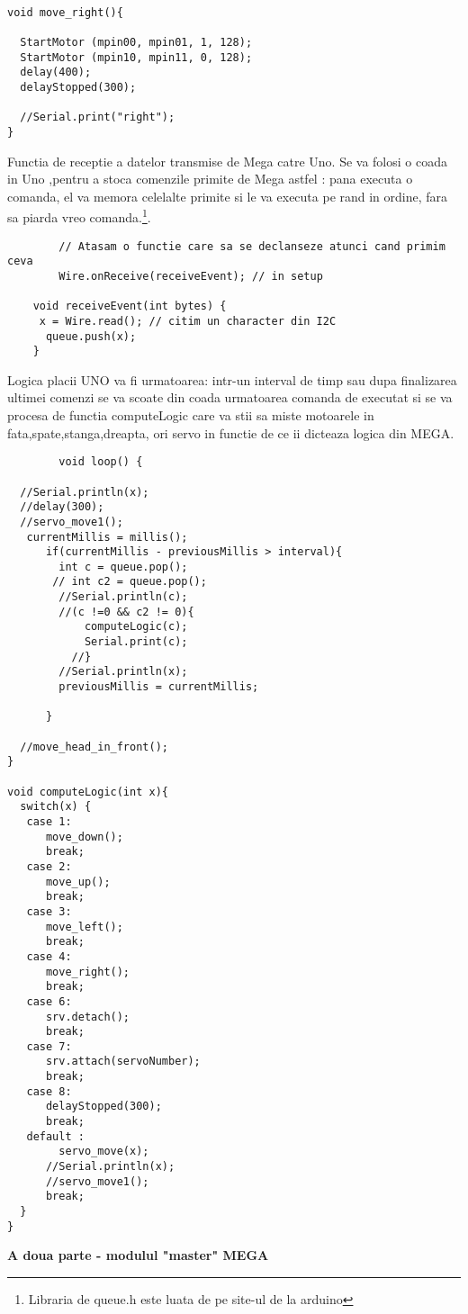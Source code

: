 \begin{itemize}
\begin{verbatim}
 
void move_right(){
  
  StartMotor (mpin00, mpin01, 1, 128);
  StartMotor (mpin10, mpin11, 0, 128);
  delay(400);
  delayStopped(300);
  
  //Serial.print("right");
}
	\end{verbatim}

	\tab Functia de receptie a datelor transmise de Mega catre Uno. Se va folosi o coada in Uno ,pentru a stoca comenzile primite de Mega astfel : pana executa o comanda, el va memora celelalte primite si le va executa pe rand in ordine, fara sa piarda vreo comanda.\footnote{Libraria de queue.h este luata de pe site-ul de la arduino}.
	\begin{verbatim}
		// Atasam o functie care sa se declanseze atunci cand primim ceva
 		Wire.onReceive(receiveEvent); // in setup

	void receiveEvent(int bytes) {
	 x = Wire.read(); // citim un character din I2C
 	  queue.push(x);
	}
	\end{verbatim}
	\tab Logica placii UNO va fi urmatoarea: intr-un interval de timp sau dupa finalizarea ultimei comenzi se va scoate din coada urmatoarea comanda de executat si se va procesa de functia computeLogic care va stii sa miste motoarele in fata,spate,stanga,dreapta, ori servo in functie de ce ii dicteaza logica din MEGA.\\

	\begin{verbatim}
		void loop() {
 
  //Serial.println(x);
  //delay(300);
  //servo_move1();
   currentMillis = millis();
      if(currentMillis - previousMillis > interval){
        int c = queue.pop();
       // int c2 = queue.pop();
        //Serial.println(c);
        //(c !=0 && c2 != 0){
            computeLogic(c);
            Serial.print(c);
          //}
        //Serial.println(x);
        previousMillis = currentMillis;
         
      }
 
  //move_head_in_front();
}

void computeLogic(int x){
  switch(x) {
   case 1:
      move_down();
      break;
   case 2:
      move_up();
      break;
   case 3:
      move_left();
      break;
   case 4:
      move_right();
      break;
   case 6:
      srv.detach();
      break;
   case 7:
      srv.attach(servoNumber);
      break;
   case 8:
      delayStopped(300);
      break;
   default :
        servo_move(x);
      //Serial.println(x);
      //servo_move1();
      break;
  }
}
	\end{verbatim}
	\tab\tab \bf{A doua parte - modulul "master" MEGA}\\


\end{itemize}
